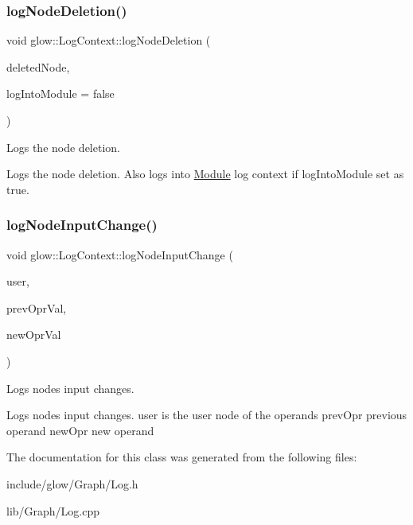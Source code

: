 \subsubsection{\texorpdfstring{log\+Node\+Deletion()}{logNodeDeletion()}}
{\footnotesize\ttfamily void glow\+::\+Log\+Context\+::log\+Node\+Deletion (\begin{DoxyParamCaption}\item[{const \hyperlink{classglow_1_1_node}{Node} \&}]{deleted\+Node,  }\item[{bool}]{log\+Into\+Module = {\ttfamily false} }\end{DoxyParamCaption})}



Logs the node deletion. 

Logs the node deletion. Also logs into \hyperlink{classglow_1_1_module}{Module} log context if {\ttfamily log\+Into\+Module} set as true. \mbox{\label{classglow_1_1_log_context_a03bfee023d7c01e3c1a3701a56fbe0c6}} 
\subsubsection{\texorpdfstring{log\+Node\+Input\+Change()}{logNodeInputChange()}}
{\footnotesize\ttfamily void glow\+::\+Log\+Context\+::log\+Node\+Input\+Change (\begin{DoxyParamCaption}\item[{const \hyperlink{classglow_1_1_node}{Node} \&}]{user,  }\item[{const \hyperlink{structglow_1_1_node_value}{Node\+Value} \&}]{prev\+Opr\+Val,  }\item[{const \hyperlink{structglow_1_1_node_value}{Node\+Value} \&}]{new\+Opr\+Val }\end{DoxyParamCaption})}



Logs node\textquotesingle{}s input changes. 

Logs node\textquotesingle{}s input changes. {\ttfamily user} is the user node of the operands {\ttfamily prev\+Opr} previous operand {\ttfamily new\+Opr} new operand 

The documentation for this class was generated from the following files\+:\begin{DoxyCompactItemize}
\item 
include/glow/\+Graph/Log.\+h\item 
lib/\+Graph/Log.\+cpp\end{DoxyCompactItemize}
